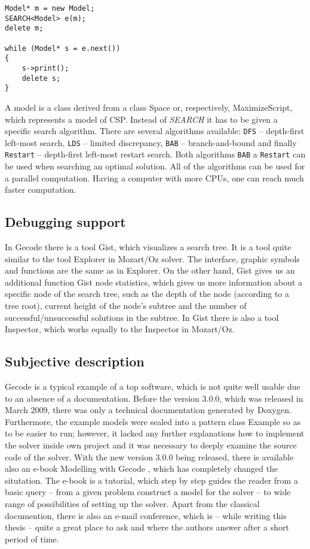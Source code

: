 \begin{verbatim}
Model* m = new Model;	
SEARCH<Model> e(m);
delete m;

while (Model* s = e.next())
{
	s->print();
	delete s;
}  
\end{verbatim}

A model is a class derived from a class Space or, respectively, MaximizeScript, which
represents a model of CSP. Instead of {\em SEARCH} it has to be given a specific search
algorithm. There are several algorithms available: \texttt{DFS} -- depth-first left-most search, \texttt{LDS} -- limited discrepancy,
\texttt{BAB} -- branch-and-bound and finally \texttt{Restart} -- depth-first left-most
restart search. Both algorithms \texttt{BAB} a \texttt{Restart} can be used when 
searching an optimal solution. All of the algorithms can be used for a parallel computation.
Having a computer with more CPUs, one can reach much faster computation.

\subsection{Debugging support}
In Gecode there is a tool Gist, which visualizes a search tree. It is a tool quite 
similar to the tool Explorer in Mozart/Oz solver. The interface, graphic symbols and
functions are the same as in Explorer. On the other hand, Gist gives us an additional 
function Gist node statistics, which gives us more information about a specific node 
of the search tree, such as the depth of the node (according to a tree root), current height
of the node's subtree and the number of successful/unsuccessful solutions in the subtree.
In Gist there is also a tool Inspector, which works equally to the Inspector in Mozart/Oz.
   

\subsection{Subjective description}
Gecode is a typical example of a top software, which is not quite well usable due to
an absence of a documentation. Before the version 3.0.0, which was released in March 2009, there
was only a technical documentation generated by Doxygen. Furthermore, the example models were 
sealed into a pattern class Example so as to be easier to run; however, it lacked any further 
explanations how to implement the solver inside own project and it was necessary to deeply
examine the source code of the solver. With the new version 3.0.0 being released, there is
available also an e-book Modelling with Gecode \cite{gecode:modelling}, which has completely changed
the situtation. The e-book is a tutorial, which step by step guides the reader from a basic 
query -- from a given problem construct a model for the solver -- to wide range of possibilities
of setting up the solver. Apart from the classical documention, there is also an e-mail conference,
which is -- while writing this thesis -- quite a great place to ask and where the authors
answer after a short period of time.
